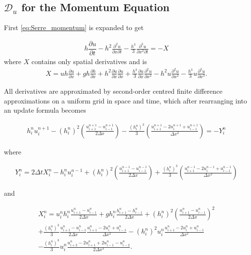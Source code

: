 \documentclass[times]{elsarticle}
\begin{document}
\subsection{$\mathcal{D}_u$ for the Momentum Equation}
First \eqref{eq:Serre_momentum} is expanded to get
\begin{linenomath*}
		\begin{gather}
		h\dfrac{\partial u}{\partial t} - h^2\frac{\partial^2 u}{\partial x \partial t} - \frac{h^3}{3}\frac{\partial^3 u}{\partial x^2 \partial t}  = -X 
		\label{eq:expandedu}
		\end{gather}
		where $X$ contains only spatial derivatives and is
		\begin{gather}
		X = uh\frac{\partial u}{\partial x} + gh\frac{\partial h}{\partial x} + h^2\frac{\partial u}{\partial x}\frac{\partial u}{\partial x} + \frac{h^3}{3}\frac{\partial u}{\partial x}\frac{\partial^2 u}{\partial x^2} - h^2u\frac{\partial^2 u}{\partial x^2}- \frac{h^3}{3}u\frac{\partial^3 u}{\partial x^3} .
		\end{gather}
\end{linenomath*}
All derivatives are approximated by second-order centred finite difference approximations on a uniform grid in space and time, which after rearranging into an update formula becomes
\begin{linenomath*}
	\begin{gather}
	h^{n}_iu^{n+1}_i - \left(h^{n}_i\right)^2 \left(\frac{u^{n+1}_{i+1} -u^{n+1}_{i-1} }{2 \Delta x}\right) - \frac{\left(h^{n}_i\right)^3}{3}\left(\frac{u^{n+1}_{i+1} - 2u^{n+1}_{i} + u^{n+1}_{i-1} }{\Delta x^2}\right) = - Y^n_i
	\label{eq:expandedutdisc3}
	\end{gather}
\end{linenomath*}
where
\begin{linenomath*}
	\begin{gather*}
	Y_i^n = 2\Delta tX_i^{n} - h_i^{n}u_i^{n-1} + \left(h_i^{n}\right)^2\left(\frac{u^{n-1}_{i+1} -u^{n-1}_{i-1} }{2 \Delta x}\right) + \frac{\left(h_i^{n}\right)^3}{3}\left(\frac{u^{n-1}_{i+1} - 2u^{n-1}_{i} + u^{n-1}_{i-1} }{\Delta x^2}\right)
	\label{eq:expandfactor Xp}
	\end{gather*}
\end{linenomath*}
and
\begin{linenomath*}
\begin{multline*}
X_i^n = u_i^nh_i^n\frac{u^{n}_{i+1} -u^{n}_{i-1} }{2 \Delta x} + gh^n_i\frac{h^{n}_{i+1} -h^{n}_{i-1} }{2 \Delta x} + \left(h^n_i\right)^2\left(\frac{u^{n}_{i+1} -u^{n}_{i-1} }{2 \Delta x} \right)^2  \\ + \frac{\left(h^n_i\right)^3}{3}\frac{u^{n}_{i+1} -u^{n}_{i-1} }{2 \Delta x}\frac{u^{n}_{i+1} - 2u^{n}_{i} + u^{n}_{i-1} }{\Delta x^2} - \left(h^n_i\right)^2u_i^n\frac{u^{n}_{i+1} - 2u^{n}_{i} + u^{n}_{i-1} }{\Delta x^2} \\- \frac{\left(h^n_i\right)^3}{3}u^n_i \frac{u^{n}_{i+2} - 2u^{n}_{i+1} + 2u^{n}_{i-1} - u^{n}_{i-2} }{2\Delta x^3}.
\end{multline*}
\end{linenomath*}
\end{document}
